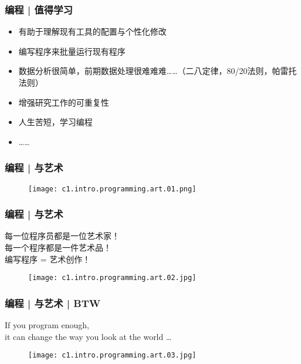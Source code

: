 \begin{frame}
  \frametitle{编程 | 值得学习}
  \begin{itemize}
    \item 有助于理解现有工具的配置与个性化修改
    \item 编写程序来批量运行现有程序
    \item
      数据分析很简单，前期数据处理很难难难……（二八定律，80/20法则，帕雷托法则）
    \item 增强研究工作的可重复性
    \item 人生苦短，学习编程
    \item ……
  \end{itemize}
\end{frame}

\begin{frame}
  \frametitle{编程 | 与艺术}
  \begin{figure}
    \centering
    \texttt{[image: c1.intro.programming.art.01.png]}
  \end{figure}
\end{frame}

\begin{frame}
  \frametitle{编程 | 与艺术}
  \begin{center}
    \large{每一位程序员都是一位艺术家！\\
    每一个程序都是一件艺术品！\\
    编写程序 = 艺术创作！}
\end{center}
\vspace{-1em}
  \begin{figure}
    \centering
    \texttt{[image: c1.intro.programming.art.02.jpg]}
  \end{figure}
\end{frame}

\begin{frame}
  \frametitle{编程 | 与艺术 | BTW}
  \begin{center}
    \large{If you program enough,\\ it can change the way you look at the world …}
\end{center}
\vspace{-1em}
  \begin{figure}
    \centering
    \texttt{[image: c1.intro.programming.art.03.jpg]}
  \end{figure}
\end{frame}

